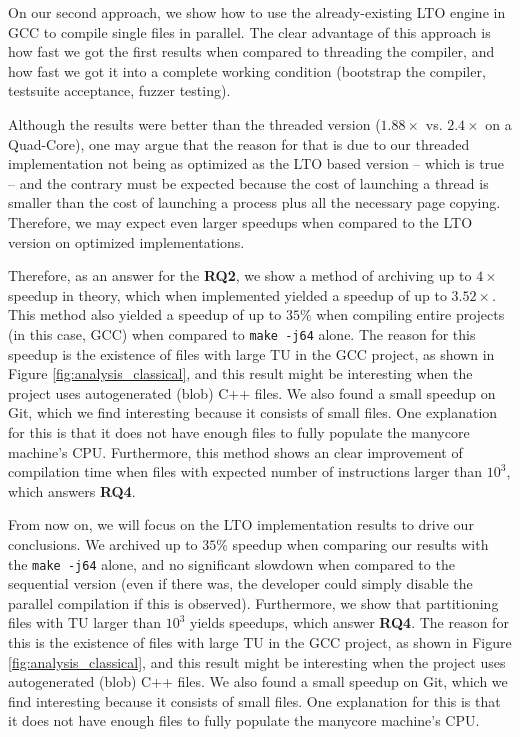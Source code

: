On our second approach, we show how to use the already-existing LTO engine in
GCC to compile single files in parallel. The clear advantage of this approach
is how fast we got the first results when compared to threading the compiler,
and how fast we got it into a complete working condition (bootstrap the
compiler, testsuite acceptance, fuzzer testing).

Although the results were better than the threaded version ($1.88\times$ vs. $2.4\times$
on a Quad-Core),
one may argue that the reason for that is due to our threaded implementation
not being as optimized as the LTO based version -- which is true -- and the
contrary must be expected because the cost of launching a thread is smaller
than the cost of launching a process plus all the necessary page copying.
Therefore, we may expect even larger speedups when compared to the LTO version
on optimized implementations.

Therefore, as an answer for the \textbf{RQ2}, we show a method of archiving up
to $4\times$ speedup in theory, which when implemented yielded a speedup of up
to $3.52\times$. This method also yielded a speedup of up to $35\%$ when
compiling entire projects (in this case, GCC) when compared to \texttt{make
-j64} alone. The reason for this speedup is the existence of files with large
TU in the GCC project, as shown in Figure \ref{fig:analysis_classical}, and
this result might be interesting when the project uses autogenerated (blob) C++
files. We also found a small speedup on Git, which we find interesting because
it consists of small files. One explanation for this is that it does not have
enough files to fully populate the manycore machine's CPU. Furthermore,
this method shows an clear improvement of compilation time when files
with expected number of instructions larger than $10^3$, which answers
\textbf{RQ4}.


From now on, we will focus on the LTO implementation results to drive our
conclusions. We archived up to $35\%$ speedup when comparing our results with
the \texttt{make -j64} alone, and no significant slowdown when compared to the
sequential version (even if there was, the developer could simply disable the
parallel compilation if this is observed). Furthermore, we show that
partitioning files with TU larger than $10^3$ yields speedups, which answer
\textbf{RQ4}. The reason for this is the existence of files with large TU in
the GCC project, as shown in Figure \ref{fig:analysis_classical}, and this
result might be interesting when the project uses autogenerated (blob) C++
files. We also found a small speedup on Git, which we find interesting because
it consists of small files. One explanation for this is that it does not have
enough files to fully populate the manycore machine's CPU.


